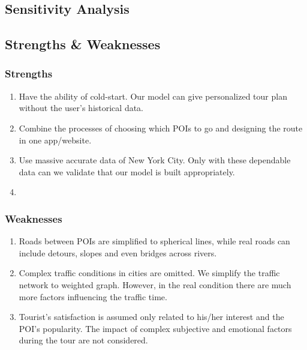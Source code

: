 \documentclass{mcmthesis}
\begin{document}
\subsection{Sensitivity Analysis}

\subsection{Strengths \& Weaknesses}
\subsubsection{Strengths}
  \begin{enumerate}
    \item Have the ability of cold-start. Our model can give personalized tour plan without the user's historical data.
    \item Combine the processes of choosing which POIs to go and designing the route in one app/website.
    \item Use massive accurate data of New York City. Only with these dependable data can we validate that our model is built appropriately.
    \item 
  \end{enumerate}
\subsubsection{Weaknesses}
  \begin{enumerate}
    \item Roads between POIs are simplified to spherical lines, while real roads can include detours, slopes and even bridges across rivers.
    \item Complex traffic conditions in cities are omitted. We simplify the traffic network to weighted graph. However, in the real condition there are much more factors influencing the traffic time.
    \item Tourist's satisfaction is assumed only related to his/her interest and the POI's popularity. The impact of complex subjective and emotional factors during the tour are not considered.
  \end{enumerate}
\end{document}
